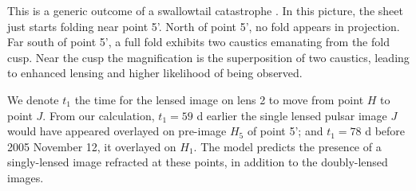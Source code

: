 \documentclass[useAMS,usenatbib]{mn2e}
\begin{document}
This is a generic outcome of a swallowtail
catastrophe \citep{Arnold1990}. In this picture, the sheet just
starts folding near point 5'.  North of point 5', no fold appears in
projection.  Far south of point 5', a full fold exhibits two caustics
emanating from the fold cusp.  Near the cusp the magnification is the
superposition of two caustics, leading to enhanced lensing and higher
likelihood of being observed.  

We denote $t_1$ the time for the lensed image on lens 2 to move from point
$H$ to point $J$. From our calculation, $t_1=59$ d earlier the
single lensed pulsar image  $J$ would have appeared overlayed on
pre-image $H_5$ of point
5'; and $t_1=78$ d 
before 2005 November 12, it overlayed on $H_1$. The
model predicts the presence of a singly-lensed image refracted at
these points, in addition to the doubly-lensed images.

\end{document}
